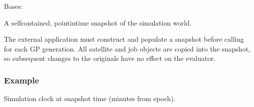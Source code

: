 \documentclass[letterpaper,10pt,english]{sphinxmanual}
\begin{document}
\begin{fulllineitems}
\label{\detokenize{api:scheduler.SimulationSnapshot}}
\pysigstartsignatures
\pysigline
{}
\pysigstopsignatures
\sphinxAtStartPar
Bases: 

\sphinxAtStartPar
A self\sphinxhyphen{}contained, point\sphinxhyphen{}in\sphinxhyphen{}time snapshot of the simulation world.

\sphinxAtStartPar
The external application must construct and populate a snapshot before
calling {\hyperref[\detokenize{api:scheduler.FitnessEvaluator.evaluate}]{}} for each GP generation.
All satellite and job objects are copied into the snapshot, so subsequent
changes to the originals have no effect on the evaluator.
\subsubsection*{Example}

\begin{sphinxVerbatim}[commandchars=\\\{\}]
  
      
         
               
         
\end{sphinxVerbatim}

\begin{fulllineitems}
\label{\detokenize{api:scheduler.SimulationSnapshot.currentMinute}}
\pysigstartsignatures
\pysigline
{}
\pysigstopsignatures
\sphinxAtStartPar
Simulation clock at snapshot time (minutes from epoch).

\end{fulllineitems}



\end{fulllineitems}
\end{document}
